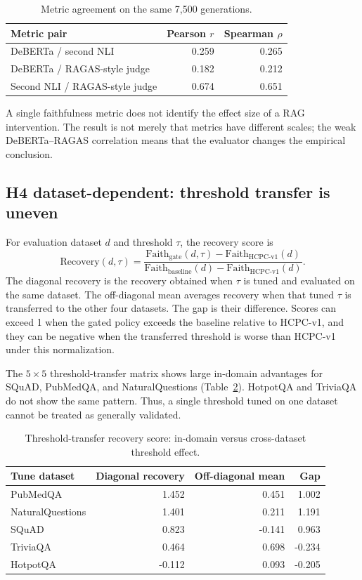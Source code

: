 \begin{table}[H]
\centering
\small
\caption{Metric agreement on the same 7,500 generations.}
\label{tab:metric_corr}
\begin{tabular}{lrr}
\toprule
Metric pair & Pearson $r$ & Spearman $\rho$ \\
\midrule
DeBERTa / second NLI & 0.259 & 0.265 \\
DeBERTa / RAGAS-style judge & 0.182 & 0.212 \\
Second NLI / RAGAS-style judge & 0.674 & 0.651 \\
\bottomrule
\end{tabular}
\end{table}

A single faithfulness metric does not identify the effect size of a RAG
intervention. The result is not merely that metrics have different scales; the
weak DeBERTa--RAGAS correlation means that the evaluator changes the empirical
conclusion.

\subsection{H4 dataset-dependent: threshold transfer is uneven}

For evaluation dataset $d$ and threshold $\tau$, the recovery score is
\[
\mathrm{Recovery}(d,\tau) =
\frac{\mathrm{Faith}_{\mathrm{gate}}(d,\tau) -
\mathrm{Faith}_{\mathrm{HCPC}\mbox{-}\mathrm{v1}}(d)}
{\mathrm{Faith}_{\mathrm{baseline}}(d) -
\mathrm{Faith}_{\mathrm{HCPC}\mbox{-}\mathrm{v1}}(d)}.
\]
The diagonal recovery is the recovery obtained when $\tau$ is tuned and
evaluated on the same dataset. The off-diagonal mean averages recovery when
that tuned $\tau$ is transferred to the other four datasets. The gap is their
difference. Scores can exceed 1 when the gated policy exceeds the baseline
relative to HCPC-v1, and they can be negative when the transferred threshold is
worse than HCPC-v1 under this normalization.

The $5\times5$ threshold-transfer matrix shows large in-domain advantages for
SQuAD, PubMedQA, and NaturalQuestions (Table~\ref{tab:tauflags}). HotpotQA and
TriviaQA do not show the same pattern. Thus, a single threshold tuned on one
dataset cannot be treated as generally validated.

\begin{table}[H]
\centering
\small
\caption{Threshold-transfer recovery score: in-domain versus cross-dataset
threshold effect.}
\label{tab:tauflags}
\begin{tabular}{lrrr}
\toprule
Tune dataset & Diagonal recovery & Off-diagonal mean & Gap \\
\midrule
PubMedQA & 1.452 & 0.451 & 1.002 \\
NaturalQuestions & 1.401 & 0.211 & 1.191 \\
SQuAD & 0.823 & -0.141 & 0.963 \\
TriviaQA & 0.464 & 0.698 & -0.234 \\
HotpotQA & -0.112 & 0.093 & -0.205 \\
\bottomrule
\end{tabular}
\end{table}


